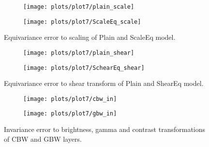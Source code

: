     \begin{figure}[h!]
    \begin{adjustwidth}{-11em}{-11em}
        \centering
        \begin{subfigure}{0.5\textwidth}
            \texttt{[image: plots/plot7/plain\_scale]}
        \end{subfigure}
        \begin{subfigure}{0.5\textwidth}
            \texttt{[image: plots/plot7/ScaleEq\_scale]}
        \end{subfigure}
    \end{adjustwidth}
        \caption{Equivariance error to scaling of Plain and ScaleEq
        model.}
        \label{fig:plot7scale}
    \end{figure}


    \begin{figure}[h!]
    \begin{adjustwidth}{-11em}{-11em}
        \centering
        \begin{subfigure}{0.55\textwidth}
            \texttt{[image: plots/plot7/plain\_shear]}
        \end{subfigure}
        \begin{subfigure}{0.55\textwidth}
            \texttt{[image: plots/plot7/SchearEq\_shear]}
        \end{subfigure}
    \end{adjustwidth}
        \caption{Equivariance error to shear transform of Plain and ShearEq
        model.}
        \label{fig:plot7shear}
    \end{figure}


    \begin{figure}[h!]
    \centering
        \begin{subfigure}{\textwidth}
            \texttt{[image: plots/plot7/cbw\_in]}
        \end{subfigure}
        \begin{subfigure}{\textwidth}
            \texttt{[image: plots/plot7/gbw\_in]}
        \end{subfigure}
        \caption{Invariance error to brightness, gamma and contrast
            transformations of CBW and GBW layers.}
        \label{fig:plot7inv}
    \end{figure}
